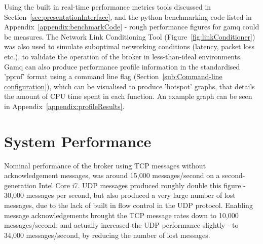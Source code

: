 Using the built in real-time performance metrics tools discussed in
Section~\ref{sec:presentationInterface}, and the python benchmarking code listed
in Appendix~\ref{appendix:benchmarkCode} - rough performance figures for gamq could
be measures. The Network Link Conditioning Tool
(Figure~\ref{fig:linkConditioner}) was also used to simulate suboptimal
networking conditions (latency, packet loss etc.), to validate the operation of
the broker in less-than-ideal environments. Gamq can also produce performance
profile information in the standardised 'pprof' format using a command line flag
(Section~\ref{sub:Command-line configuration}), which can be visualised to
produce 'hotspot' graphs, that details the amount of CPU time spent in each
function. An example graph can be seen in Appendix~\ref{appendix:profileResults}.

\section{System Performance}
\label{sec:systemPerformance}

Nominal performance of the broker using TCP messages without acknowledgement
messages, was around 15,000 messages/second on a second-generation Intel Core
i7. UDP messages produced roughly double this figure - 30,000 messages per
second, but also produced a very large number of lost messages, due to the lack
of built in flow control in the UDP protocol. Enabling message acknowledgements
brought the TCP message rates down to 10,000 messages/second, and actually
increased the UDP performance slightly - to 34,000 messages/second, by reducing
the number of lost messages.
